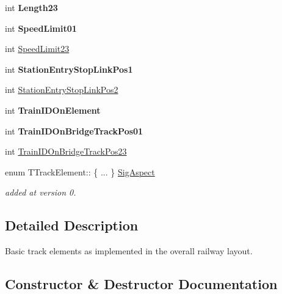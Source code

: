 \begin{DoxyCompactItemize}
int {\bfseries Length23}
\item 
\mbox{\label{class_t_track_element_aa58aa17b09e19894f83844b6a0d26b1c}} 
int {\bfseries Speed\+Limit01}
\item 
int \mbox{\hyperlink{class_t_track_element_abd898b7031200a2f24c1315b52c965cd}{Speed\+Limit23}}
\item 
\mbox{\label{class_t_track_element_a243af97a79009b237beb0cdd6f7db969}} 
int {\bfseries Station\+Entry\+Stop\+Link\+Pos1}
\item 
int \mbox{\hyperlink{class_t_track_element_af6b589b13c3b59adb3c493816316ffe1}{Station\+Entry\+Stop\+Link\+Pos2}}
\item 
\mbox{\label{class_t_track_element_a5f6319bc1752da843be71f1024774ace}} 
int {\bfseries Train\+I\+D\+On\+Element}
\item 
\mbox{\label{class_t_track_element_a9751b1ee4085deff881cd8f39bbd293b}} 
int {\bfseries Train\+I\+D\+On\+Bridge\+Track\+Pos01}
\item 
int \mbox{\hyperlink{class_t_track_element_aa3d8b1fef605f7ef4e6b09360abbb528}{Train\+I\+D\+On\+Bridge\+Track\+Pos23}}
\item 
\mbox{\label{class_t_track_element_a2742b1ba840a4e8895d074e00791c464}} 
enum T\+Track\+Element\+:: \{ ... \}  \mbox{\hyperlink{class_t_track_element_a2742b1ba840a4e8895d074e00791c464}{Sig\+Aspect}}
\begin{DoxyCompactList}\small\item\em added at version 0. \end{DoxyCompactList}\end{DoxyCompactItemize}


\subsection{Detailed Description}
Basic track elements as implemented in the overall railway layout. 

\subsection{Constructor \& Destructor Documentation}
\mbox{\label{class_t_track_element_a47b976d743e1d92e81ee807c410ef094}} 
